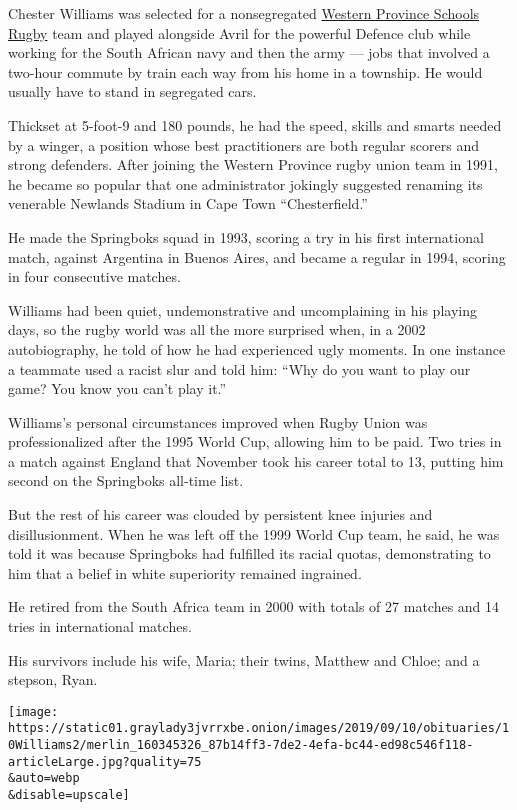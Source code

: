 Chester Williams was selected for a nonsegregated
\href{http://www.wpschoolrugby.co.za/}{Western Province Schools Rugby}
team and played alongside Avril for the powerful Defence club while
working for the South African navy and then the army --- jobs that
involved a two-hour commute by train each way from his home in a
township. He would usually have to stand in segregated cars.

Thickset at 5-foot-9 and 180 pounds, he had the speed, skills and smarts
needed by a winger, a position whose best practitioners are both regular
scorers and strong defenders. After joining the Western Province rugby
union team in 1991, he became so popular that one administrator jokingly
suggested renaming its venerable Newlands Stadium in Cape Town
``Chesterfield.''

He made the Springboks squad in 1993, scoring a try in his first
international match, against Argentina in Buenos Aires, and became a
regular in 1994, scoring in four consecutive matches.

Williams had been quiet, undemonstrative and uncomplaining in his
playing days, so the rugby world was all the more surprised when, in a
2002 autobiography, he told of how he had experienced ugly moments. In
one instance a teammate used a racist slur and told him: ``Why do you
want to play our game? You know you can't play it.''

Williams's personal circumstances improved when Rugby Union was
professionalized after the 1995 World Cup, allowing him to be paid. Two
tries in a match against England that November took his career total to
13, putting him second on the Springboks all-time list.

But the rest of his career was clouded by persistent knee injuries and
disillusionment. When he was left off the 1999 World Cup team, he said,
he was told it was because Springboks had fulfilled its racial quotas,
demonstrating to him that a belief in white superiority remained
ingrained.

He retired from the South Africa team in 2000 with totals of 27 matches
and 14 tries in international matches.

His survivors include his wife, Maria; their twins, Matthew and Chloe;
and a stepson, Ryan.

\texttt{[image: https://static01.graylady3jvrrxbe.onion/images/2019/09/10/obituaries/10Williams2/merlin\_160345326\_87b14ff3-7de2-4efa-bc44-ed98c546f118-articleLarge.jpg?quality=75\\\&auto=webp\\\&disable=upscale]}


